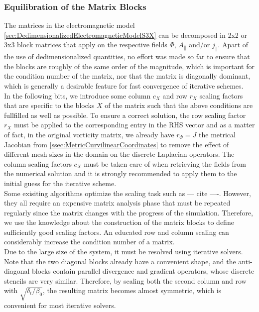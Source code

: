 \subsubsection{Equilibration of the Matrix Blocks}
\label{ssec:equilibrationBLockMatrices}
The matrices in the electromagnetic model \autoref{sec:DedimensionalizedElectromagneticModelS3X} can be decomposed in 2x2 or 3x3 block matrices that apply on the respective fields $\Phi$, $A_\parallel$ and/or $j_\parallel$. Apart of the use of dedimensionalized quantities, no effort was made so far to ensure that the blocks are roughly of the same order of the magnitude, which is important for the condition number of the matrix, nor that the matrix is diagonally dominant, which is generally a desirable feature for fast convergence of iterative schemes. \\
In the following bits, we introduce some column $c_X$ and row $r_X$ scaling factors that are specific to the blocks $X$ of the matrix such that the above conditions are fullfilled as well as possible. To ensure a correct solution, the row scaling factor $r_X$ must be applied to the corresponding entry in the RHS vector and as a matter of fact, in the original vorticity matrix, we already have $r_\Phi = J$ the metrical Jacobian from \autoref{ssec:MetricCurvilinearCoordinates} to remove the effect of different mesh sizes in the domain on the discrete Laplacian operators. The column scaling factors $c_X$ must be taken care of when retrieving the fields from the numerical solution and it is strongly recommended to apply them to the initial guess for the iterative scheme. \\ 
Some exisiting algorithms optimize the scaling task such as  --- cite ----. However, they all require an expensive matrix analysis phase that must be repeated regularly since the matrix changes with the progress of the simulation. Therefore, we use the knowledge about the construction of the matrix blocks to define sufficiently good scaling factors. An educated row and column scaling can considerably increase the condition number of a matrix\cite{van1969condition}.\\

Due to the large size of the system, it must be resolved using iterative solvers. Note that the two diagonal blocks already have a convenient shape, and the anti-diagonal blocks contain parallel divergence and gradient operators, whose discrete stencils are very similar. Therefore, by scaling both the second column and row with $\sqrt{\delta_t / \beta_0}$, the resulting matrix becomes almost symmetric, which is convenient for most iterative solvers.


